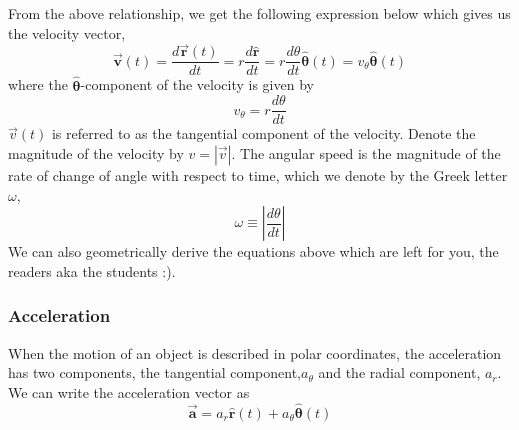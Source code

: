 \documentclass[12pt,addpoints]{exam}
\begin{document}
	From the above relationship, we get the following expression below which gives us the velocity vector,
	$$\overrightarrow{\mathbf{v}}(t)=\frac{d \overrightarrow{\mathbf{r}}(t)}{d t}=r \frac{d \hat{\mathbf{r}}}{d t}=r \frac{d \theta}{d t} \hat{\boldsymbol{\theta}}(t)=v_{\theta} \hat{\boldsymbol{\theta}}(t) \nonumber$$
	where the  $\hat{\boldsymbol{\theta}}$-component of the velocity is given by
	$$v_{\theta}=r \frac{d \theta}{d t} \nonumber$$
	$\vec{v}(t)$ is referred to as the tangential component of the velocity. Denote the magnitude of the velocity by  $v=|\vec{v}|$. The angular speed is the magnitude of the rate of change of angle with respect to time, which we denote by the Greek letter $\omega$,
	$$\omega \equiv\left|\frac{d \theta}{d t}\right| \nonumber$$
	We can also geometrically derive the equations above which are left for you, the readers aka the students :).
	\subsubsection*{Acceleration}
	When the motion of an object is described in polar coordinates, the acceleration has two components, the tangential component,$a_\theta$ and the radial component, $a_r$. We can write the acceleration vector as
	$$\overrightarrow{\mathbf{a}}=a_{r} \hat{\mathbf{r}}(t)+a_{\theta} \hat{\boldsymbol{\theta}}(t)$$
	
\end{document}
